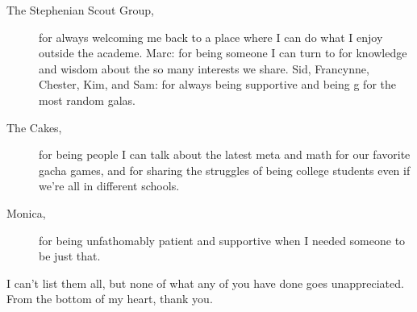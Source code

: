 \begin{description}
    \item[The Stephenian Scout Group,] for always welcoming me back to a place where I can do what I enjoy outside the academe. Marc: for being someone I can turn to for knowledge and wisdom about the so many interests we share. Sid, Francynne, Chester, Kim, and Sam: for always being supportive and being g for the most random galas.
    \item[The Cakes,] for being people I can talk about the latest meta and math for our favorite gacha games, and for sharing the struggles of being college students even if we're all in different schools.
    \item[Monica,] for being unfathomably patient and supportive when I needed someone to be just that.
\end{description}

I can't list them all, but none of what any of you have done goes unappreciated. From the bottom of my heart, thank you.
